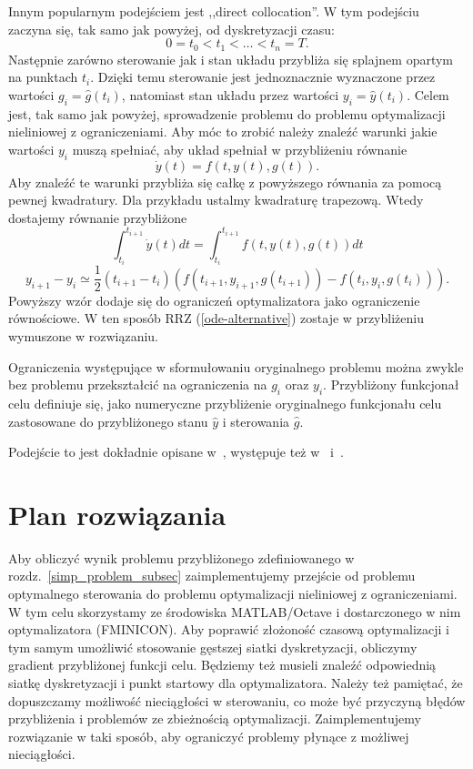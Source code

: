 \documentclass[licencjacka]{pracamgr}
\begin{document}
Innym popularnym podejściem jest ,,direct collocation''. W tym podejściu zaczyna się, tak samo jak powyżej, od dyskretyzacji czasu:
\begin{equation}
  0 = t_0 < t_1 < \ldots < t_n = T.
\end{equation}
Następnie zarówno sterowanie jak i stan układu przybliża się splajnem opartym na punktach $t_i$. Dzięki temu sterowanie jest jednoznacznie wyznaczone przez wartości $g_i = \hat{g}(t_i)$, natomiast stan układu przez wartości $y_i = \hat{y}(t_i)$. Celem jest, tak samo jak powyżej, sprowadzenie problemu do problemu optymalizacji nieliniowej z ograniczeniami. Aby móc to zrobić należy znaleźć warunki jakie wartości $y_i$ muszą spełniać, aby układ spełniał w przybliżeniu równanie
\begin{equation}\label{ode-alternative}
  \dot{y}(t) = f(t,y(t),g(t)).
\end{equation}
Aby znaleźć te warunki przybliża się całkę z powyższego równania za pomocą pewnej kwadratury. Dla przykładu ustalmy kwadraturę trapezową. Wtedy dostajemy równanie przybliżone
\begin{equation}
  \int_{t_i}^{t_{i+1}} \dot{y}(t)dt = \int_{t_i}^{t_{i+1}} f(t,y(t),g(t))dt
\end{equation}
\begin{equation}
  y_{i+1} - y_{i} \simeq \frac{1}{2}(t_{i+1}-t_i)(f(t_{i+1}, y_{i+1}, g(t_{i+1})) - f(t_i, y_i, g(t_i))).
\end{equation}
Powyższy wzór dodaje się do ograniczeń optymalizatora jako ograniczenie równościowe. W ten sposób RRZ (\ref{ode-alternative}) zostaje w przybliżeniu wymuszone w rozwiązaniu.

Ograniczenia występujące w sformułowaniu oryginalnego problemu można zwykle bez problemu przekształcić na ograniczenia na $g_i$ oraz $y_i$. Przybliżony funkcjonał celu definiuje się, jako numeryczne przybliżenie oryginalnego funkcjonału celu zastosowane do przybliżonego stanu $\hat{y}$ i sterowania $\hat{g}$.

Podejście to jest dokładnie opisane w~\cite{Kelly}, występuje też w~\cite{diehl} i~\cite{rao-methods}.

\section{Plan rozwiązania}
Aby obliczyć wynik problemu przybliżonego zdefiniowanego w rozdz.~\ref{simp_problem_subsec} zaimplementujemy przejście od problemu optymalnego sterowania do problemu optymalizacji nieliniowej z ograniczeniami. W tym celu skorzystamy ze środowiska MATLAB/Octave i dostarczonego w nim optymalizatora (FMINICON). Aby poprawić złożoność czasową optymalizacji i tym samym umożliwić stosowanie gęstszej siatki dyskretyzacji, obliczymy gradient przybliżonej funkcji celu. Będziemy też musieli znaleźć odpowiednią siatkę dyskretyzacji i punkt startowy dla optymalizatora. Należy też pamiętać, że dopuszczamy możliwość nieciągłości w sterowaniu, co może być przyczyną błędów przybliżenia i problemów ze zbieżnością optymalizacji. Zaimplementujemy rozwiązanie w taki sposób, aby ograniczyć problemy płynące z możliwej nieciągłości.
\end{document}
